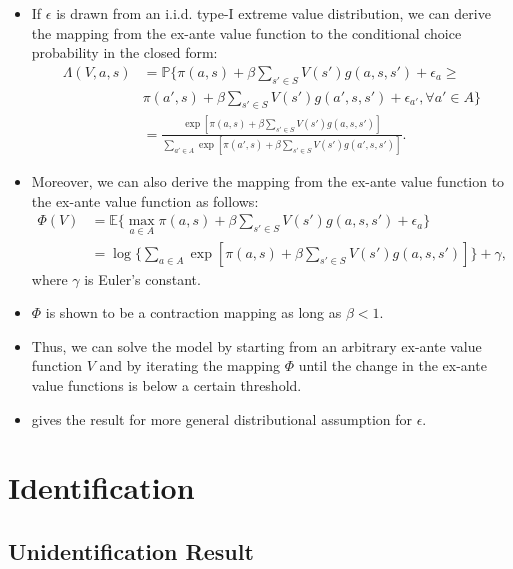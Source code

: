 \documentclass[
]{book}
\providecommand{\tightlist}{%
  \setlength{\itemsep}{0pt}\setlength{\parskip}{0pt}}
\begin{document}
\begin{itemize}
\tightlist
\item
  If \(\epsilon\) is drawn from an i.i.d. type-I extreme value distribution, we can derive the mapping from the ex-ante value function to the conditional choice probability in the closed form:
  \begin{equation}
  \begin{split}
  \Lambda(V, a, s) &= \mathbb{P}\{\pi(a , s) + \beta \sum_{s' \in S} V(s') g(a, s, s') + \epsilon_{a} \ge\\
   & \pi(a' , s) + \beta \sum_{s' \in S} V(s') g(a', s, s') + \epsilon_{a'}, \forall a' \in A\}\\
  &=\frac{\exp[\pi(a , s) + \beta \sum_{s' \in S} V(s') g(a, s, s')]}{\sum_{a' \in A} \exp[\pi(a' , s) + \beta \sum_{s' \in S} V(s') g(a', s, s')]}.
  \end{split}
  \end{equation}
\item
  Moreover, we can also derive the mapping from the ex-ante value function to the ex-ante value function as follows:
  \begin{equation}
  \begin{split}
  \Phi(V) &= \mathbb{E}\{\max_{a \in A} \pi(a , s) + \beta \sum_{s' \in S} V(s') g(a, s, s') + \epsilon_{a}\} \\
  &=\log \Bigg\{\sum_{a \in A} \exp[\pi(a , s) + \beta \sum_{s' \in S} V(s') g(a, s, s')] \Bigg\} + \gamma,
  \end{split}
  \end{equation}
  where \(\gamma\) is Euler's constant.
\item
  \(\Phi\) is shown to be a contraction mapping as long as \(\beta < 1\).
\item
  Thus, we can solve the model by starting from an arbitrary ex-ante value function \(V\) and by iterating the mapping \(\Phi\) until the change in the ex-ante value functions is below a certain threshold.
\item
  \citet{rustOptimalReplacementGMC1987} gives the result for more general distributional assumption for \(\epsilon\).
\end{itemize}

\hypertarget{identification}{%
\section{Identification}\label{identification}}

\hypertarget{unidentification-result}{%
\subsection{Unidentification Result}\label{unidentification-result}}
\end{document}
